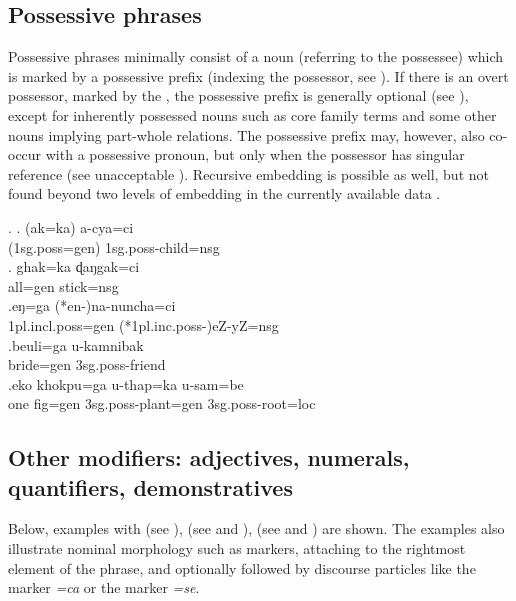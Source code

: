 \subsection{Possessive phrases}\label{str-np-poss}

Possessive phrases minimally consist  of a noun (referring to the possessee) which is marked by a possessive prefix (indexing the possessor, see \Next[a]). If there is an overt possessor, marked by the , the possessive prefix is generally optional (see \Next[b]), except for inherently possessed nouns such as core family terms and some other nouns implying part-whole relations. The possessive prefix may, however, also  co-occur with a possessive pronoun, but only when the possessor has singular reference (see unacceptable \Next[c]). Recursive embedding is possible as well, but not found beyond two levels of embedding in the currently available data \Next[e].

\ex. \ag. (ak=ka)        a-cya=ci\\
({\sc 1sg.poss=gen}) {\sc 1sg.poss-}child{\sc =nsg}\\
 
\bg. ghak=ka    ɖaŋgak=ci\\
all{\sc =gen} stick{\sc =nsg}\\
 
\bg.eŋ=ga              (*en-)na-nuncha=ci\\
{\sc 1pl.incl.poss=gen} (*{\sc 1pl.inc.poss-})eZ-yZ{\sc =nsg}\\
 
\bg.beuli=ga    u-kamnibak\\ 
bride{\sc =gen} {\sc 3sg.poss-}friend\\
\bg.eko khokpu=ga      u-thap=ka              u-sam=be\\
one fig{\sc =gen} {\sc 3sg.poss-}plant{\sc =gen} {\sc 3sg.poss-}root{\sc =loc}\\
 

\subsection{Other modifiers: adjectives, numerals, quantifiers, demonstratives}\label{str-np-mod}

Below, examples with  (see \Next[a]),  (see \Next[b] and \Next[c]),  (see \Next[d] and \Next[e]) are shown. The examples also illustrate nominal morphology such as  markers, attaching to the rightmost element of the phrase, and optionally followed by discourse particles like the  marker \emph{=ca} or the  marker \emph{=se}.

